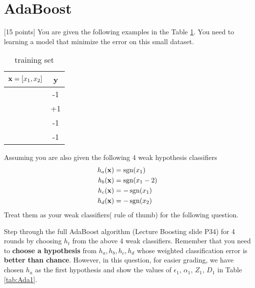 \section{AdaBoost }

[15 points] You are given the following examples in the Table \ref{tab:AdaBoost}. You need to learning a model that minimize the error on this small dataset. 
\begin{table}[H]
  \centering
  \caption{training set}
  \label{tab:AdaBoost}
  \begin{tabular}{|c|c|}
    \hline
    ${\bf x} = [x_1,x_2]$  & y  \\ \hline
    [1,1]  & -1 \\ \hline
    [1,-1]  & +1 \\ \hline
    [-1,-1] & -1 \\ \hline
    [-1,-1] & -1 \\ \hline
  \end{tabular}
\end{table}
Assuming you are also given the following 4 weak hypothesis classifiers
\begin{align*}
  h_a(\bf{x})&= \operatorname{sgn}(x_1) \\
  h_b(\bf{x}) &= \operatorname{sgn}(x_1-2) \\
  h_c(\bf{x}) &= -\operatorname{sgn}(x_1) \\
  h_d(\bf{x}) &= -\operatorname{sgn}(x_2) \\
\end{align*}
Treat them as your weak classifiers( rule of thumb) for the following
question.

Step through the full AdaBoost algorithm (Lecture Boosting slide P34)
for 4 rounds by choosing $h_t$ from the above 4 weak classifiers.
Remember that you need to {\bf choose a hypothesis } from $h_a, h_b,
h_c, h_d$ whose weighted classification error is {\bf better than
  chance}. However, in this question, for easier grading, we have
chosen $h_a$ as the first hypothesis and show the values of
$\epsilon_1$, $\alpha_1$, $Z_1$, $D_1$ in Table \ref{tab:Ada1}. 

